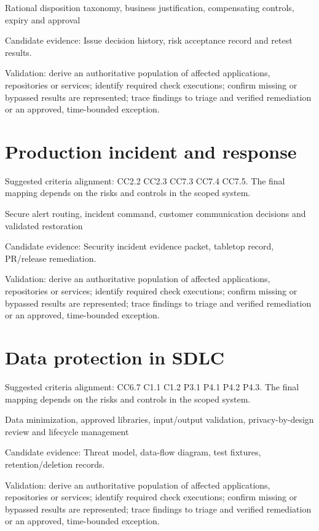 \documentclass[10pt,oneside]{report}
\begin{document}
\begin{engineeringbox}
Rational disposition taxonomy, business justification, compensating controls, expiry and approval
\end{engineeringbox}
Candidate evidence: Issue decision history, risk acceptance record and retest results.

Validation: derive an authoritative population of affected applications, repositories or services; identify required check executions; confirm missing or bypassed results are represented; trace findings to triage and verified remediation or an approved, time-bounded exception.

\section{Production incident and response}
Suggested criteria alignment: CC2.2 CC2.3 CC7.3 CC7.4 CC7.5. The final mapping depends on the risks and controls in the scoped system.

\begin{engineeringbox}
Secure alert routing, incident command, customer communication decisions and validated restoration
\end{engineeringbox}
Candidate evidence: Security incident evidence packet, tabletop record, PR/release remediation.

Validation: derive an authoritative population of affected applications, repositories or services; identify required check executions; confirm missing or bypassed results are represented; trace findings to triage and verified remediation or an approved, time-bounded exception.

\section{Data protection in SDLC}
Suggested criteria alignment: CC6.7 C1.1 C1.2 P3.1 P4.1 P4.2 P4.3. The final mapping depends on the risks and controls in the scoped system.

\begin{engineeringbox}
Data minimization, approved libraries, input/output validation, privacy-by-design review and lifecycle management
\end{engineeringbox}
Candidate evidence: Threat model, data-flow diagram, test fixtures, retention/deletion records.

Validation: derive an authoritative population of affected applications, repositories or services; identify required check executions; confirm missing or bypassed results are represented; trace findings to triage and verified remediation or an approved, time-bounded exception.
\end{document}
